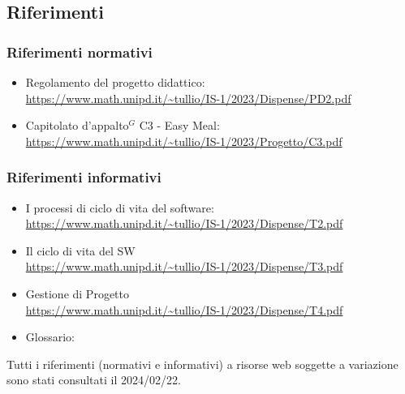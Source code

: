 \subsection{Riferimenti}
\subsubsection{Riferimenti normativi}

        \begin{itemize}
            \item Regolamento del progetto didattico: \\
            \url{https://www.math.unipd.it/~tullio/IS-1/2023/Dispense/PD2.pdf}
            \item Capitolato d’appalto$^{G}$ C3 - Easy Meal: \\
            \url{https://www.math.unipd.it/~tullio/IS-1/2023/Progetto/C3.pdf}
        \end{itemize}

        \subsubsection{Riferimenti informativi}

        \begin{itemize}
            \item I processi di ciclo di vita del software: \\
            \url{https://www.math.unipd.it/~tullio/IS-1/2023/Dispense/T2.pdf}
            \item Il ciclo di vita del SW\\
            \url{https://www.math.unipd.it/~tullio/IS-1/2023/Dispense/T3.pdf}
            \item Gestione di Progetto\\
            \url{https://www.math.unipd.it/~tullio/IS-1/2023/Dispense/T4.pdf}
            \item Glossario: \\
            \url{} %
        \end{itemize}

        Tutti i riferimenti (normativi e informativi) a risorse web soggette a variazione sono stati consultati il 2024/02/22.

